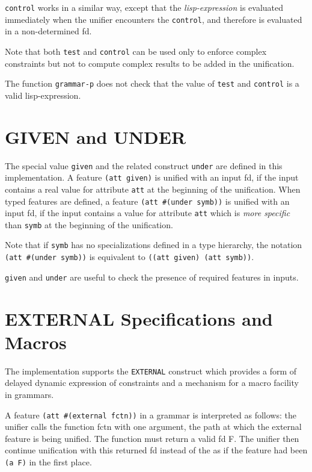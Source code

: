 \documentclass[10pt,a4paper]{report}
\begin{document}
\begin{appendices}
{\tt control} works in a similar way, except that the {\em lisp-expression}
is evaluated immediately when the unifier encounters the {\tt control},
and therefore is evaluated in a non-determined fd.

Note that both {\tt test} and {\tt control} can be used only to enforce
complex constraints but not to compute complex results to be
added in the unification.

The function {\tt grammar-p} does not check that the value of
{\tt test} and {\tt control} is a valid lisp-expression.


\section{GIVEN and UNDER}

The special value {\tt given} and the related construct {\tt under} are defined
in this implementation.  A feature {\tt (att given)} is unified with an input
fd, if the input contains a real value for attribute {\tt att} at the
beginning of the unification.  When typed features are defined, a feature
{\tt (att \#(under symb))} is unified with an input fd, if the input contains
a value for attribute {\tt att} which is {\em more specific} than {\tt symb} at
the beginning of the unification.

Note that if {\tt symb} has no specializations defined in a type hierarchy,
the notation {\tt (att \#(under symb))} is equivalent to {\tt ((att given) (att
symb))}.

{\tt given} and {\tt under} are useful to check the presence of required
features in inputs.


\section{EXTERNAL Specifications and Macros}
The implementation supports the {\tt EXTERNAL} construct which provides a
form of delayed dynamic expression of constraints and a mechanism for a
macro facility in grammars.  

A feature {\tt (att \#(external fctn))} in a grammar is interpreted as
follows: the unifier calls the function fctn with one argument, the path
at which the external feature is being unified.  The function must return a
valid fd F.  The unifier then continue unification with this returned fd
instead of the as if the feature had been {\tt (a F)} in the first place.


\end{appendices}
\end{document}
